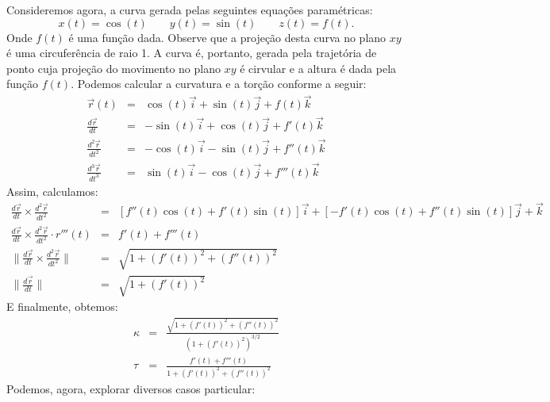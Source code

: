 \begin{ex} Consideremos agora, a curva gerada pelas seguintes equações paramétricas:
$$x(t)=\cos(t)\qquad y(t)=\sin(t)\qquad z(t)=f(t).$$
 Onde $f(t)$ é uma função dada. Observe que a projeção desta curva no plano $xy$ é uma circuferência de raio 1. A curva é, portanto, gerada pela trajetória de ponto cuja projeção do movimento no plano $xy$ é cirvular e a altura é dada pela função $f(t)$. Podemos calcular a curvatura e a torção conforme a seguir:
 \begin{eqnarray*}
  \vec{r}(t)&=&\cos(t)\vec{i}+\sin(t)\vec{j}+f(t)\vec{k}\\
  \frac{d\vec{r}}{dt}&=&-\sin(t)\vec{i}+\cos(t)\vec{j}+f'(t)\vec{k}\\
  \frac{d^2\vec{r}}{dt^2}&=&-\cos(t)\vec{i}-\sin(t)\vec{j}+f''(t)\vec{k}\\
  \frac{d^3\vec{r}}{dt^3}&=&\sin(t)\vec{i}-\cos(t)\vec{j}+f'''(t)\vec{k}
 \end{eqnarray*}
Assim, calculamos:
 \begin{eqnarray*}
  \frac{d\vec{r}}{dt} \times \frac{d^2 \vec{r}}{dt^2} &=&\left[f''(t)\cos(t)+f'(t)\sin(t)\right]\vec{i}+\left[-f'(t)\cos(t)+f''(t)\sin(t)\right]\vec{j}+\vec{k}\\
\frac{d \vec{r}}{dt} \times \frac{d^2\vec{r}}{dt^2} \cdot r'''(t)&=&f'(t)+f'''(t)\\
 \|\frac{d\vec{r}}{dt} \times\frac{d^2\vec{r}}{dt^2}\|&=&\sqrt{1+\left(f'(t)\right)^2+\left(f''(t)\right)^2}\\
 \|\frac{d\vec{r}}{dt}\|&=&\sqrt{1+\left(f'(t)\right)^2}
 \end{eqnarray*}
E finalmente, obtemos:
 \begin{eqnarray*}
\kappa&=&\frac{\sqrt{1+\left(f'(t)\right)^2+\left(f''(t)\right)^2}}{\left({1+\left(f'(t)\right)^2}\right)^{3/2}}\\
\tau&=&\frac{f'(t)+f'''(t)}{1+\left(f'(t)\right)^2+\left(f''(t)\right)^2}
 \end{eqnarray*}
Podemos, agora, explorar diversos casos particular:
\end{ex}
